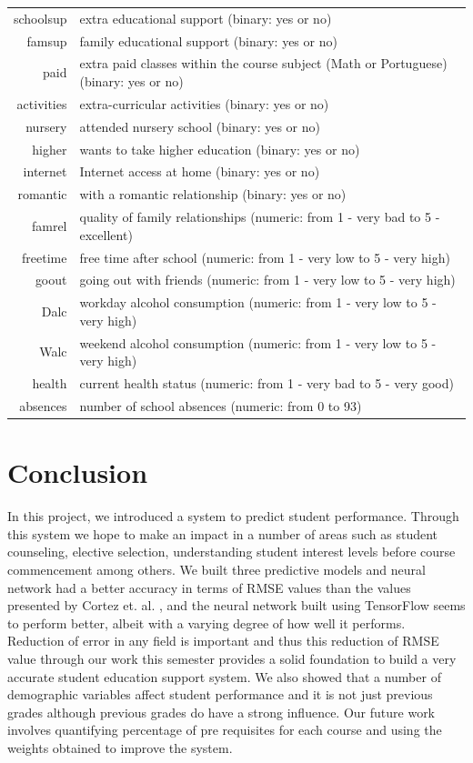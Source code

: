 \documentclass[conference]{IEEEtran}
\begin{document}
\begin{table}[!t]
\begin{tabular}{|r || l|}
schoolsup & extra educational support (binary: yes or no)\\
famsup & family educational support (binary: yes or no)\\
paid & extra paid classes within the course subject (Math or Portuguese) (binary: yes or no)\\
activities & extra-curricular activities (binary: yes or no)\\
nursery & attended nursery school (binary: yes or no)\\
higher & wants to take higher education (binary: yes or no)\\
internet & Internet access at home (binary: yes or no)\\
romantic & with a romantic relationship (binary: yes or no)\\
famrel & quality of family relationships (numeric: from 1 - very bad to 5 - excellent)\\
freetime & free time after school (numeric: from 1 - very low to 5 - very high)\\
goout & going out with friends (numeric: from 1 - very low to 5 - very high)\\
Dalc & workday alcohol consumption (numeric: from 1 - very low to 5 - very high)\\
Walc & weekend alcohol consumption (numeric: from 1 - very low to 5 - very high)\\
health & current health status (numeric: from 1 - very bad to 5 - very good)\\
absences & number of school absences (numeric: from 0 to 93)\\
\hline
\end{tabular}
\end{table}

	\section{Conclusion}
In this project, we introduced a system to predict student performance. Through this system we hope to make an impact in a number of areas such as student counseling, elective selection, understanding student interest levels before course commencement among others. We built three predictive models and neural network had a better accuracy in terms of RMSE values than the values presented by Cortez et. al. \cite{ref:4}, and the neural network built using TensorFlow \cite{tensorflow2015-whitepaper} seems to perform better, albeit with a varying degree of how well it performs. Reduction of error in any field is important and thus this reduction of RMSE value through our work this semester provides a solid foundation to build a very accurate student education support system. We also showed that a number of demographic variables affect student performance and it is not just previous grades although previous grades do have a strong influence. Our future work involves quantifying percentage of pre requisites for each course and using the weights obtained to improve the system.
\end{document}
